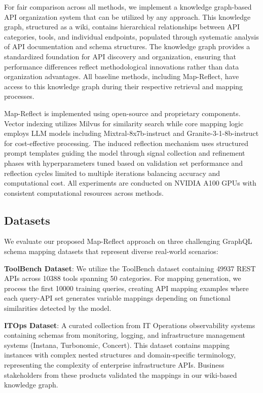 \documentclass[sigconf, nonacm]{acmart}
\begin{document}
For fair comparison across all methods, we implement a knowledge graph-based API organization system that can be utilized by any approach. This knowledge graph, structured as a wiki, contains hierarchical relationships between API categories, tools, and individual endpoints, populated through systematic analysis of API documentation and schema structures. The knowledge graph provides a standardized foundation for API discovery and organization, ensuring that performance differences reflect methodological innovations rather than data organization advantages. All baseline methods, including Map-Reflect, have access to this knowledge graph during their respective retrieval and mapping processes.

Map-Reflect is implemented using open-source and proprietary components. Vector indexing utilizes Milvus for similarity search while core mapping logic employs LLM models including Mixtral-8x7b-instruct and Granite-3-1-8b-instruct for cost-effective processing. The induced reflection mechanism uses structured prompt templates guiding the model through signal collection and refinement phases with hyperparameters tuned based on validation set performance and reflection cycles limited to multiple iterations balancing accuracy and computational cost. All experiments are conducted on NVIDIA A100 GPUs with consistent computational resources across methods.

\subsection{Datasets}

We evaluate our proposed Map-Reflect approach on three challenging GraphQL schema mapping datasets that represent diverse real-world scenarios:

\textbf{ToolBench Dataset}: We utilize the ToolBench dataset containing 49937 REST APIs across 10388 tools spanning 50 categories. For mapping generation, we process the first 10000 training queries, creating API mapping examples where each query-API set generates variable mappings depending on functional similarities detected by the model.

\textbf{ITOps Dataset}: A curated collection from IT Operations observability systems containing schemas from monitoring, logging, and infrastructure management systems (Instana, Turbonomic, Concert). This dataset contains mapping instances with complex nested structures and domain-specific terminology, representing the complexity of enterprise infrastructure APIs. Business stakeholders from these products validated the mappings in our wiki-based knowledge graph.
\end{document}
